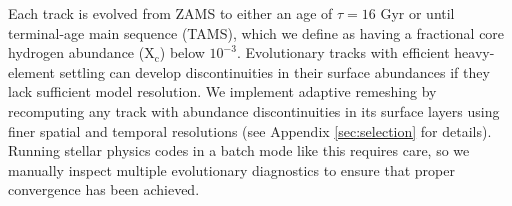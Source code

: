 \documentclass[manuscript,linenumbers]{aastex6}
\begin{document}
Each track is evolved from ZAMS to either an age of $\tau=16$ Gyr or until terminal-age main sequence (TAMS), which we define as having a fractional core hydrogen abundance (X$_{\text{c}}$) below $10^{-3}$. Evolutionary tracks with efficient heavy-element settling can develop discontinuities in their surface abundances if they lack sufficient model resolution. We implement adaptive remeshing by recomputing any track with abundance discontinuities in its surface layers using finer spatial and temporal resolutions (see Appendix \ref{sec:selection} for details). Running stellar physics codes in a batch mode like this requires care, so we manually inspect multiple evolutionary diagnostics to ensure that proper convergence has been achieved. %



\end{document}
